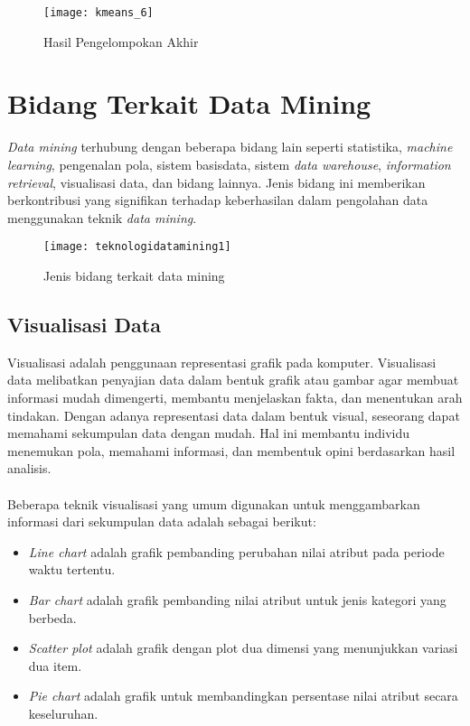 \begin{enumerate}
\begin{figure}[H]
	\centering
	\texttt{[image: kmeans\_6]}
	\caption{Hasil Pengelompokan Akhir}
	\label{fig:kmeans_6}
\end{figure}



\end{enumerate}





\newpage
\section{Bidang Terkait Data Mining}
\textit{Data mining} terhubung dengan beberapa bidang lain seperti statistika, \textit{machine learning}, pengenalan pola, sistem basisdata, sistem \textit{data warehouse}, \textit{information retrieval}, visualisasi data, dan bidang lainnya. Jenis bidang ini memberikan berkontribusi yang signifikan terhadap keberhasilan dalam pengolahan data menggunakan teknik \textit{data mining}.

\begin{figure}[H]
	\centering
	\texttt{[image: teknologidatamining1]}
	\caption{Jenis bidang terkait data mining}
	\label{fig:rnaalgorithm}
\end{figure}

\subsection{Visualisasi Data} 
Visualisasi adalah penggunaan representasi grafik pada komputer. Visualisasi data melibatkan penyajian data dalam bentuk grafik atau gambar agar membuat informasi mudah dimengerti, membantu menjelaskan fakta, dan menentukan arah tindakan.  Dengan adanya representasi data dalam bentuk visual, seseorang dapat memahami sekumpulan data dengan mudah. Hal ini membantu individu  menemukan pola, memahami informasi, dan membentuk opini berdasarkan hasil analisis. 
\\\\
Beberapa teknik visualisasi yang umum digunakan untuk menggambarkan informasi dari sekumpulan data adalah sebagai berikut:

\begin{itemize}
\item \textit{Line chart} adalah grafik pembanding perubahan nilai atribut pada periode waktu tertentu.
\item \textit{Bar chart} adalah grafik pembanding nilai atribut untuk jenis kategori yang berbeda.
\item \textit{Scatter plot} adalah grafik dengan plot dua dimensi yang menunjukkan variasi dua item.
\item \textit{Pie chart} adalah grafik untuk membandingkan persentase nilai atribut secara keseluruhan.
\end{itemize}

